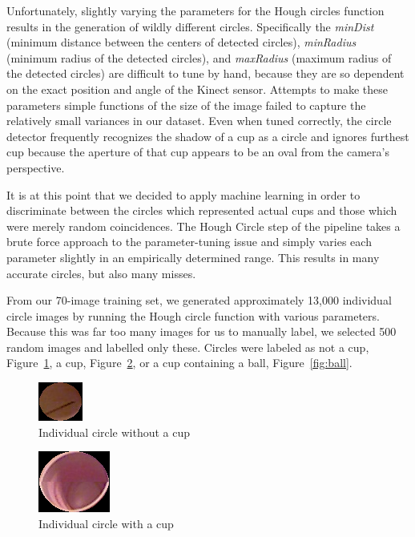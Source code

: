 \documentclass[letterpaper, 10 pt, conference]{ieeeconf}  %
\begin{document}
Unfortunately, slightly varying the parameters for the Hough circles function results in the generation of wildly different circles.  Specifically the \emph{minDist} (minimum distance between the centers of detected circles), \emph{minRadius} (minimum radius of the detected circles), and \emph{maxRadius} (maximum radius of the detected circles) are difficult to tune by hand, because they are so dependent on the exact position and angle of the Kinect sensor.  Attempts to make these parameters simple functions of the size of the image failed to capture the relatively small variances in our dataset.  Even when tuned correctly, the circle detector frequently recognizes the shadow of a cup as a circle and ignores furthest cup because the aperture of that cup appears to be an oval from the camera's perspective.

It is at this point that we decided to apply machine learning in order to discriminate between the circles which represented actual cups and those which were merely random coincidences.  The Hough Circle step of the pipeline takes a brute force approach to the parameter-tuning issue and simply varies each parameter slightly in an empirically determined range.  This results in many accurate circles, but also many misses.  

From our 70-image training set, we generated approximately 13,000 individual circle images by running the Hough circle function with various parameters.  Because this was far too many images for us to manually label, we selected 500 random images and labelled only these.  Circles were labeled as not a cup, Figure~\ref{fig:not_cup}, a cup, Figure~\ref{fig:cup}, or a cup containing a ball, Figure~\ref{fig:ball}.  



\begin{figure}[thpb]
      \centering
	  \includegraphics[scale =1]{single3}
      \caption{Individual circle without a cup}
      \label{fig:not_cup}
\end{figure}

\begin{figure}[thpb]
      \centering
	  \includegraphics[scale =0.8]{single2}
      \caption{Individual circle with a cup}
      \label{fig:cup}
\end{figure}
\end{document}
